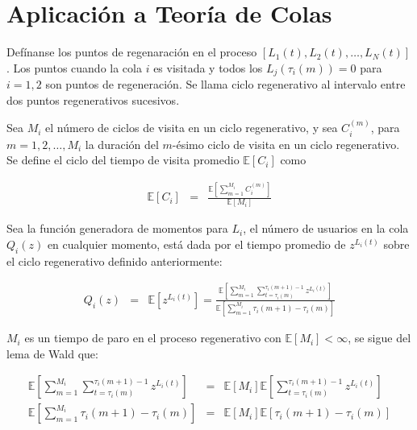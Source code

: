 \documentclass{article}
\newcommand{\esp}{\mathbb{E}}
\numberwithin{equation}{section}
\begin{document}
\section{Aplicaci\'on a Teor\'ia de Colas}



Def\'inanse los puntos de regenaraci\'on  en el proceso $\left[L_{1}\left(t\right),L_{2}\left(t\right),\ldots,L_{N}\left(t\right)\right]$. Los puntos cuando la cola $i$ es visitada y todos los $L_{j}\left(\tau_{i}\left(m\right)\right)=0$ para $i=1,2$  son puntos de regeneraci\'on. Se llama ciclo regenerativo al intervalo entre dos puntos regenerativos sucesivos.

Sea $M_{i}$  el n\'umero de ciclos de visita en un ciclo regenerativo, y sea $C_{i}^{(m)}$, para $m=1,2,\ldots,M_{i}$ la duraci\'on del $m$-\'esimo ciclo de visita en un ciclo regenerativo. Se define el ciclo del tiempo de visita promedio $\esp\left[C_{i}\right]$ como

\begin{eqnarray*}
\esp\left[C_{i}\right]&=&\frac{\esp\left[\sum_{m=1}^{M_{i}}C_{i}^{(m)}\right]}{\esp\left[M_{i}\right]}
\end{eqnarray*}




Sea la funci\'on generadora de momentos para $L_{i}$, el n\'umero de usuarios en la cola $Q_{i}\left(z\right)$ en cualquier momento, est\'a dada por el tiempo promedio de $z^{L_{i}\left(t\right)}$ sobre el ciclo regenerativo definido anteriormente:

\begin{eqnarray*}
Q_{i}\left(z\right)&=&\esp\left[z^{L_{i}\left(t\right)}\right]=\frac{\esp\left[\sum_{m=1}^{M_{i}}\sum_{t=\tau_{i}\left(m\right)}^{\tau_{i}\left(m+1\right)-1}z^{L_{i}\left(t\right)}\right]}{\esp\left[\sum_{m=1}^{M_{i}}\tau_{i}\left(m+1\right)-\tau_{i}\left(m\right)\right]}
\end{eqnarray*}

$M_{i}$ es un tiempo de paro en el proceso regenerativo con $\esp\left[M_{i}\right]<\infty$, se sigue del lema de Wald que:


\begin{eqnarray*}
\esp\left[\sum_{m=1}^{M_{i}}\sum_{t=\tau_{i}\left(m\right)}^{\tau_{i}\left(m+1\right)-1}z^{L_{i}\left(t\right)}\right]&=&\esp\left[M_{i}\right]\esp\left[\sum_{t=\tau_{i}\left(m\right)}^{\tau_{i}\left(m+1\right)-1}z^{L_{i}\left(t\right)}\right]\\
\esp\left[\sum_{m=1}^{M_{i}}\tau_{i}\left(m+1\right)-\tau_{i}\left(m\right)\right]&=&\esp\left[M_{i}\right]\esp\left[\tau_{i}\left(m+1\right)-\tau_{i}\left(m\right)\right]
\end{eqnarray*}
\end{document}

